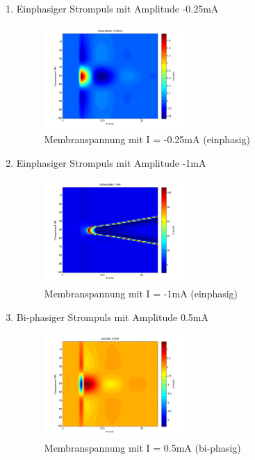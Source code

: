 \documentclass[conference]{IEEEtran}
\begin{document}
\begin{enumerate}
\item Einphasiger Strompuls mit Amplitude -0.25mA
\begin{figure}[h!]
	\centering
	\includegraphics[width=0.5\textwidth]{img/mono_neg_025_1.png}
	\caption{Membranspannung mit I = -0.25mA (einphasig)}
	\label{fig:mono_neg_025_1}
\end{figure}

\item Einphasiger Strompuls mit Amplitude -1mA
\begin{figure}[h!]
	\centering
	\includegraphics[width=0.5\textwidth]{img/mono_neg_1_1.png}
	\caption{Membranspannung mit I = -1mA (einphasig)}
	\label{fig:mono_neg_1_1}
\end{figure}

\item Bi-phasiger Strompuls mit Amplitude 0.5mA
\begin{figure}[h!]
	\centering
	\includegraphics[width=0.5\textwidth]{img/bi_05_1.png}
	\caption{Membranspannung mit I = 0.5mA (bi-phasig)}
	\label{fig:bi_05_1}
\end{figure}


\end{enumerate}
\end{document}
